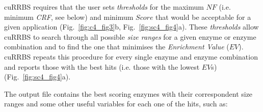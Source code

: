 \bigskip

cuRRBS requires that the user sets \textit{thresholds} for the maximum $NF$ (i.e. minimum \textit{\acrshort{CRF}}, see below) and minimum $Score$ that would be acceptable for a given application (Fig.~\ref{fig:c4_fig3}b, Fig.~\ref{fig:sc4_fig4}a). These \textit{thresholds} allow cuRRBS to search through all possible \textit{size ranges} for a given enzyme or enzyme combination and to find the one that minimises the \textit{Enrichment Value} ($EV$). cuRRBS repeats this procedure for every single enzyme and enzyme combination and reports those with the best hits (i.e. those with the lowest $EV$s) (Fig.~\ref{fig:sc4_fig4}a).

\bigskip

The output file contains the best scoring enzymes with their correspondent size ranges and some other useful variables for each one of the hits, such as:

